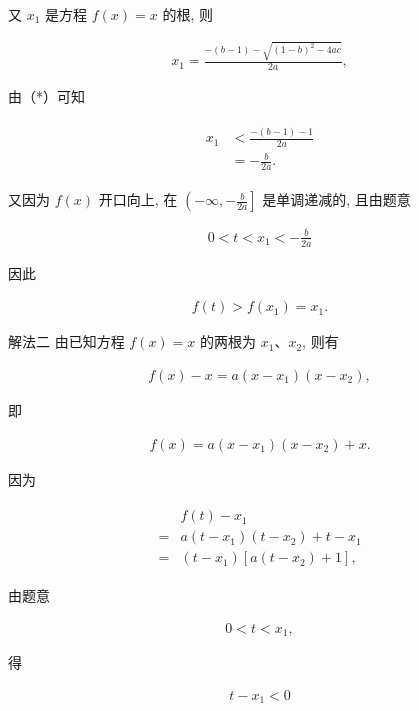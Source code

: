 \documentclass[10pt]{article}
\begin{document}
又 $x_{1}$ 是方程 $f(x)=x$ 的根, 则

\begin{align*}
x_{1}=\frac{-(b-1)-\sqrt{(1-b)^{2}-4 a c}}{2 a},
\end{align*}

由（*）可知

\begin{align*}
\begin{aligned}
x_{1} & <\frac{-(b-1)-1}{2 a} \\
& =-\frac{b}{2 a} .
\end{aligned}
\end{align*}

又因为 $f(x)$ 开口向上, 在 $\left(-\infty,-\frac{b}{2 a}\right]$ 是单调递减的, 且由题意

\begin{align*}
0<t<x_{1}<-\frac{b}{2 a}
\end{align*}

因此

\begin{align*}
f(t)>f\left(x_{1}\right)=x_{1} .
\end{align*}

解法二 由已知方程 $f(x)=x$ 的两根为 $x_{1} 、 x_{2}$, 则有

\begin{align*}
f(x)-x=a\left(x-x_{1}\right)\left(x-x_{2}\right),
\end{align*}

即

\begin{align*}
f(x)=a\left(x-x_{1}\right)\left(x-x_{2}\right)+x .
\end{align*}

因为

\begin{align*}
\begin{aligned}
& f(t)-x_{1} \\
= & a\left(t-x_{1}\right)\left(t-x_{2}\right)+t-x_{1} \\
= & \left(t-x_{1}\right)\left[a\left(t-x_{2}\right)+1\right],
\end{aligned}
\end{align*}

由题意

\begin{align*}
0<t<x_{1},
\end{align*}

得

\begin{align*}
t-x_{1}<0 \tag{1}
\end{align*}
\end{document}
